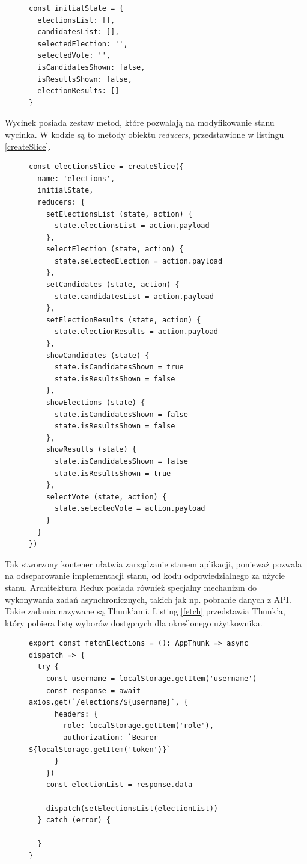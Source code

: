 \documentclass[a4paper,12pt]{book}
\begin{document}
\begin{figure}  
  \centering
\begin{lstlisting}[style=ES6, caption={Stan początkowy wycinka \textit{electionsSlice}.}, label={slice}]
const initialState = {
  electionsList: [],
  candidatesList: [],
  selectedElection: '',
  selectedVote: '',
  isCandidatesShown: false,
  isResultsShown: false,
  electionResults: []
}
\end{lstlisting}
\end{figure}
Wycinek posiada zestaw metod, które pozwalają na modyfikowanie stanu wycinka. W kodzie są to metody obiektu \textit{reducers}, przedstawione w listingu \ref{createSlice}.

\newpage

\begin{figure}  
\centering
\begin{lstlisting}[style=ES6, caption={Wycinek \textit{electionsSlice}.}, label={createSlice}]
const electionsSlice = createSlice({
  name: 'elections',
  initialState,
  reducers: {
    setElectionsList (state, action) {
      state.electionsList = action.payload
    },
    selectElection (state, action) {
      state.selectedElection = action.payload
    },
    setCandidates (state, action) {
      state.candidatesList = action.payload
    },
    setElectionResults (state, action) {
      state.electionResults = action.payload
    },
    showCandidates (state) {
      state.isCandidatesShown = true
      state.isResultsShown = false
    },
    showElections (state) {
      state.isCandidatesShown = false
      state.isResultsShown = false
    },
    showResults (state) {
      state.isCandidatesShown = false
      state.isResultsShown = true
    },
    selectVote (state, action) {
      state.selectedVote = action.payload
    }
  }
})
\end{lstlisting}
\end{figure}
Tak stworzony kontener ułatwia zarządzanie stanem aplikacji, ponieważ pozwala na odseparowanie implementacji stanu, od kodu odpowiedzialnego za użycie stanu. Architektura Redux posiada również specjalny mechanizm do wykonywania zadań asynchronicznych, takich jak np. pobranie danych z API. Takie zadania nazywane są Thunk'ami. Listing \ref{fetch} przedstawia Thunk'a, który pobiera listę wyborów dostępnych dla określonego użytkownika.

\newpage

\begin{figure}
\centering
\begin{lstlisting}[style=ES6, caption={Thunk \textit{fetchElection}.}, label={fetch}]
export const fetchElections = (): AppThunk => async dispatch => {
  try {
    const username = localStorage.getItem('username')
    const response = await axios.get(`/elections/${username}`, {
      headers: {
        role: localStorage.getItem('role'),
        authorization: `Bearer ${localStorage.getItem('token')}`
      }
    })
    const electionList = response.data

    dispatch(setElectionsList(electionList))
  } catch (error) {

  }
}
\end{lstlisting}
\end{figure}
\end{document}
